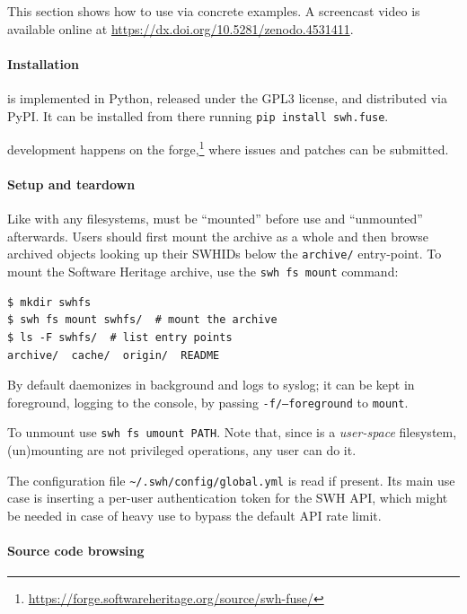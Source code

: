 This section shows how to use \SWHFS{} via concrete examples. A screencast video
is available online at \url{https://dx.doi.org/10.5281/zenodo.4531411}.

\paragraph{Installation}

\SWHFS{} is implemented in Python, released under the GPL3 license, and
distributed via PyPI.
It can be installed from there running \texttt{pip install swh.fuse}.

\SWHFS{} development happens on the \SWH{}
forge,\footnote{\url{https://forge.softwareheritage.org/source/swh-fuse/}}
where issues and patches can be submitted.

\paragraph{Setup and teardown}

Like with any filesystems, \SWHFS{} must be ``mounted'' before use and
``unmounted'' afterwards. Users should first mount the \SWH{} archive as a whole
and then browse archived objects looking up their SWHIDs below the
\texttt{archive/} entry-point. To mount the Software Heritage archive, use the
\texttt{swh fs mount} command:

\begin{verbatim}
$ mkdir swhfs
$ swh fs mount swhfs/  # mount the archive
$ ls -F swhfs/  # list entry points
archive/  cache/  origin/  README
\end{verbatim}

By default \SWHFS{} daemonizes in background and logs to syslog; it can be kept
in foreground, logging to the console, by passing \texttt{-f/--foreground} to
\texttt{mount}.

To unmount \SWHFS{} use \texttt{swh fs umount PATH}. Note that, since
\SWHFS{}
is a \emph{user-space} filesystem, (un)mounting are not privileged operations,
any user can do it.

The configuration file \texttt{\~{}/.swh/config/global.yml} is read if
present. Its main use case is inserting a per-user authentication token for the
SWH API, which might be needed in case of heavy use to bypass the default API
rate limit.


\paragraph{Source code browsing}

